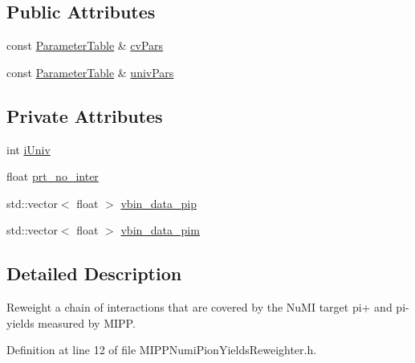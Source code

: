 \subsection*{Public Attributes}
\begin{DoxyCompactItemize}
\item 
const \hyperlink{class_neutrino_flux_reweight_1_1_parameter_table}{Parameter\-Table} \& \hyperlink{class_neutrino_flux_reweight_1_1_m_i_p_p_numi_pion_yields_reweighter_a127384f58575ad94c986aac85ea6fbe6}{cv\-Pars}
\item 
const \hyperlink{class_neutrino_flux_reweight_1_1_parameter_table}{Parameter\-Table} \& \hyperlink{class_neutrino_flux_reweight_1_1_m_i_p_p_numi_pion_yields_reweighter_a9208f5f3b7541f13f9e652d84e50c7cd}{univ\-Pars}
\end{DoxyCompactItemize}
\subsection*{Private Attributes}
\begin{DoxyCompactItemize}
\item 
int \hyperlink{class_neutrino_flux_reweight_1_1_m_i_p_p_numi_pion_yields_reweighter_a1ff57841eaa437aeb11a9793a64e47c2}{i\-Univ}
\item 
float \hyperlink{class_neutrino_flux_reweight_1_1_m_i_p_p_numi_pion_yields_reweighter_a90a2a88378549bb970b58543571206d7}{prt\-\_\-no\-\_\-inter}
\item 
std\-::vector$<$ float $>$ \hyperlink{class_neutrino_flux_reweight_1_1_m_i_p_p_numi_pion_yields_reweighter_a2120bbeea3e8b080eb68cd8ef6aa5b8e}{vbin\-\_\-data\-\_\-pip}
\item 
std\-::vector$<$ float $>$ \hyperlink{class_neutrino_flux_reweight_1_1_m_i_p_p_numi_pion_yields_reweighter_a812702b4afdcb56925d897e56a01b352}{vbin\-\_\-data\-\_\-pim}
\end{DoxyCompactItemize}


\subsection{Detailed Description}
Reweight a chain of interactions that are covered by the Nu\-M\-I target pi+ and pi-\/ yields measured by M\-I\-P\-P. 

Definition at line 12 of file M\-I\-P\-P\-Numi\-Pion\-Yields\-Reweighter.\-h.



